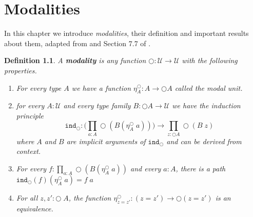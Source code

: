 \documentclass[12pt]{report}
\newtheorem{defn}[thm]{Definition}
\theoremstyle{definition}
\begin{document}
\chapter{Modalities}
In this chapter we introduce \textit{modalities}, their definition and important results about them, adapted from \cite{1706.07526} and Section 7.7 of \cite{hottbook}. 
\begin{defn}\label{modality_definition}
A \textbf{modality} is any function $\bigcirc : \mathcal{U} \rightarrow \mathcal{U}$ with the following properties.
\begin{enumerate}
	\item For every type $A$ we have a function $\eta_A^\bigcirc : A \rightarrow \bigcirc A$ called the modal unit.
	\item for every $A : \mathcal{U}$ and every type family $B : \bigcirc A \rightarrow \mathcal{U}$ we have the induction principle
	$$\mathtt{ind}_\bigcirc : \Big( \prod_{a : A}\bigcirc (B (\eta_A^\bigcirc\; a)) \Big) \rightarrow \prod_{z : \bigcirc A} \bigcirc (B\; z)$$
	where $A$ and $B$ are implicit arguments of $\mathtt{ind}_\bigcirc$ and can be derived from context. 
	\item For every $f : \prod_{a : A} \bigcirc (B(\eta_A^\bigcirc\; a))$ and every $a : A$, there is a path $\mathtt{ind}_\bigcirc (f)(\eta_A^\bigcirc\; a) = f\; a$
	\item For all $z,z' : \bigcirc \; A$, the function $\eta_{z=z'}^\bigcirc : (z = z') \rightarrow \bigcirc (z = z')$ is an equivalence.
\end{enumerate}
\end{defn}
\end{document}
